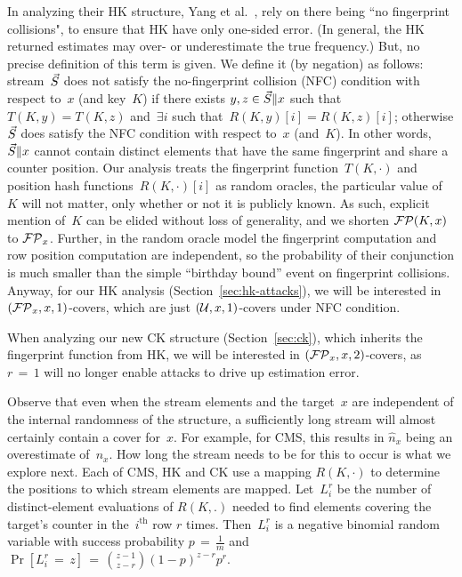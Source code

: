 In analyzing their HK structure, Yang et al.~\cite{yang2019heavykeeper}, rely on there being ``no fingerprint collisions", to ensure that HK have only one-sided error. (In general, the HK returned estimates may over- or underestimate the true frequency.)  But, no precise definition of this term is given.  We define it (by negation) as follows: stream~$\vec{S}$ does not satisfy the no-fingerprint collision (NFC) condition with respect to~$x$ (and key~$K$) if there exists $y,z \in \vec{S}\|x$ such that~$T(K,y)=T(K,z)$ and~$\exists i$ such that~$R(K,y)[i] = R(K,z)[i]$; otherwise $\vec{S}$ does satisfy the NFC condition with respect to~$x$ (and~$K$). In other words,~$\vec{S}\|x$ cannot contain distinct elements that have the same fingerprint and share a counter position.  Our analysis treats the fingerprint function~$T(K,\cdot)$ and position hash functions~$R(K,\cdot)[i]$ as random oracles, the particular value of~$K$ will not matter, only whether or not it is publicly known.  As such, explicit mention of~$K$ can be elided without loss of generality, and we shorten $\mathcal{FP}(K,x)$ to $\mathcal{FP}_x$.  Further, in the random oracle model the fingerprint computation and row position computation are independent, so the probability of their conjunction is much smaller than the simple ``birthday bound'' event on fingerprint collisions. Anyway, for our HK analysis (Section~\ref{sec:hk-attacks}), we will be interested in $(\mathcal{FP}_x,x,1)$-covers, which are just $(\mathcal{U},x,1)$-covers under NFC condition. 


When analyzing our new CK structure (Section~\ref{sec:ck}), which inherits the fingerprint function from HK, we will be interested in $(\mathcal{FP}_x,x,2)$-covers, as $r\,{=}\,1$ will no longer enable attacks to drive up estimation error.

Observe that even when the stream elements and the target~$x$ are independent of the internal randomness of the structure, a sufficiently long stream will almost certainly contain a cover for~$x$. For example, for CMS, this results in $\hat{n}_x$ being an overestimate of~$n_x$.  How long the stream needs to be for this to occur is what we explore next. 
Each of CMS, HK and CK use a mapping $R(K,\cdot)$ to determine the positions to which stream elements are mapped.
Let~$L^r_i$ be the number of distinct-element evaluations of $R(K,.)$  
needed to find elements covering the target's counter in the~$i^{\mathrm{th}}$ row $r$ times. 
Then~$L^r_i$ is a negative binomial random variable with success probability $p\,{=}\, \frac{1}{m}$ and $\Pr[L^r_i \,{=}\,  z]\,{=}\,\binom{z-1}{z-r}(1-p)^{z-r}p^{r}$. 

